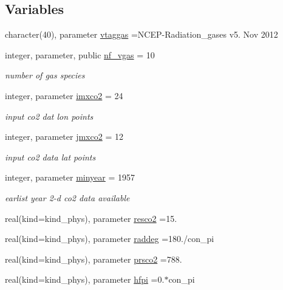 \subsection*{Variables}
\begin{DoxyCompactItemize}
\item 
character(40), parameter \hyperlink{namespacemodule__radiation__gases_a8a79a6d3d931da021cd19290c58bdfaa}{vtaggas} =\textquotesingle{}N\+C\+EP-\/Radiation\+\_\+gases v5. Nov 2012 \textquotesingle{}
\item 
integer, parameter, public \hyperlink{group__module__radiation__gases_gaffc350828412da77ff3cf3e617ddc66c}{nf\+\_\+vgas} = 10
\begin{DoxyCompactList}\small\item\em number of gas species \end{DoxyCompactList}\item 
integer, parameter \hyperlink{group__module__radiation__gases_ga46eb4079ff9932819b3ab133bf6a43d9}{imxco2} = 24
\begin{DoxyCompactList}\small\item\em input co2 dat lon points \end{DoxyCompactList}\item 
integer, parameter \hyperlink{group__module__radiation__gases_gaa56e209872093bfcbdaeb452f5e5e332}{jmxco2} = 12
\begin{DoxyCompactList}\small\item\em input co2 data lat points \end{DoxyCompactList}\item 
integer, parameter \hyperlink{group__module__radiation__gases_ga3b26af64187b57999cadeced419b0f1b}{minyear} = 1957
\begin{DoxyCompactList}\small\item\em earlist year 2-\/d co2 data available \end{DoxyCompactList}\item 
real(kind=kind\+\_\+phys), parameter \hyperlink{group__module__radiation__gases_gafda5c1d1129d865b9772e0f58dea7598}{resco2} =15.
\item 
real(kind=kind\+\_\+phys), parameter \hyperlink{group__module__radiation__gases_gaa5873ae54e950001ff873771378e7a1e}{raddeg} =180./con\+\_\+pi
\item 
real(kind=kind\+\_\+phys), parameter \hyperlink{group__module__radiation__gases_gab09dc05b8a02e9a0b56991508b599708}{prsco2} =788.
\item 
real(kind=kind\+\_\+phys), parameter \hyperlink{group__module__radiation__gases_gab99c75954c59ed92a52de94ca6113f73}{hfpi} =0.$\ast$con\+\_\+pi

\end{DoxyCompactItemize}
